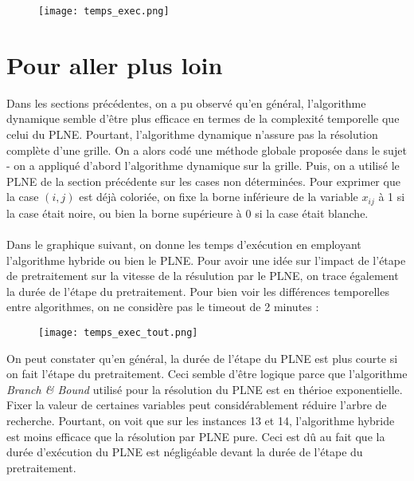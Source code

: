 \documentclass[10pt,a4paper]{article}
\begin{document}
\begin{figure}[H]
\texttt{[image: temps\_exec.png]}
\end{figure} 


\section{Pour aller plus loin}
\noindent
Dans les sections précédentes, on a pu observé qu'en général, l'algorithme dynamique semble d'être plus efficace en termes de la complexité temporelle que celui du PLNE. Pourtant, l'algorithme dynamique n'assure pas la résolution complète d'une grille. On a alors codé une méthode globale proposée dans le sujet - on a appliqué d'abord l'algorithme dynamique sur la grille. Puis, on a utilisé le PLNE de la section précédente sur les cases non déterminées. Pour exprimer que la case $(i,j)$ est déjà coloriée, on fixe la borne inférieure de la variable $x_{ij}$ à 1 si la case était noire, ou bien la borne supérieure à 0 si la case était blanche. \\ \\
\noindent
Dans le graphique suivant, on donne les temps d'exécution en employant l'algorithme hybride ou bien le PLNE. Pour avoir une idée sur l'impact de l'étape de pretraitement sur la vitesse de la résulution par le PLNE, on trace également la durée de l'étape du pretraitement. Pour bien voir les différences temporelles entre algorithmes, on ne considère pas le timeout de 2 minutes : \\ 

\begin{figure}[H]
\texttt{[image: temps\_exec\_tout.png]}
\end{figure}
\noindent
On peut constater qu'en général, la durée de l'étape du PLNE est plus courte si on fait l'étape du pretraitement. Ceci semble d'être logique parce que l'algorithme \textit{Branch \& Bound} utilisé pour la résolution du PLNE est en thérioe exponentielle. Fixer la valeur de certaines variables peut considérablement réduire l'arbre de recherche. Pourtant, on voit que sur les instances 13 et 14, l'algorithme hybride est moins efficace que la résolution par PLNE pure. Ceci est dû au fait que la durée d'exécution du PLNE est négligéable devant la durée de l'étape du pretraitement. \\ \\
\noindent
\end{document}
